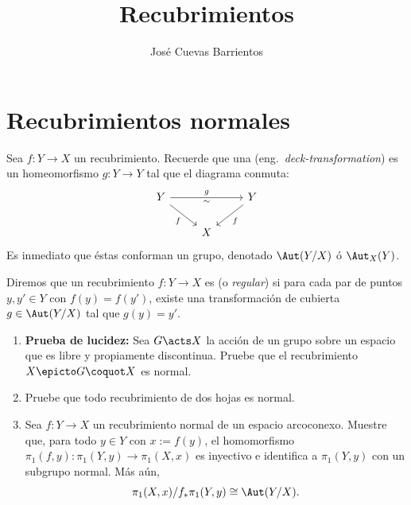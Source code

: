 \documentclass[11pt, reqno]{amsart}
\title{Recubrimientos}
\date{\DTMdate{2026-10-15}}
\author{José Cuevas Barrientos}
\DeclareMathOperator\pr{pr}
\begin{document}
\maketitle

\section{Recubrimientos normales}
Sea $f \colon Y \to X$ un recubrimiento.
Recuerde que una  (eng.\ \emph{deck-transformation}) es un homeomorfismo $g \colon Y \to Y$ tal que el
diagrama conmuta:
\[\begin{tikzcd}
	Y && Y \\
	& X
	\arrow["g", "\sim"', from=1-1, to=1-3]
	\arrow["f"', from=1-1, to=2-2]
	\arrow["f", from=1-3, to=2-2]
\end{tikzcd}\]
Es inmediato que éstas conforman un grupo, denotado $\Aut(Y/X)$ ó $\Aut_X(Y)$.
\begin{mydef}
	Diremos que un recubrimiento $f\colon Y \to X$ es  (o \emph{regular}) si para cada par de puntos $y, y' \in Y$ con
	$f(y) = f(y')$, existe una transformación de cubierta $g \in \Aut(Y/X)$ tal que $g(y) = y'$.
\end{mydef}
\begin{enumerate}
	\item \textbf{Prueba de lucidez:}
		Sea $G \acts X$ la acción de un grupo sobre un espacio que es libre y propiamente discontinua.
		Pruebe que el recubrimiento $X \epicto G\coquot X$ es normal.

	\item\label{ex:twofold_cov}
		Pruebe que todo recubrimiento de dos hojas es normal.

	\item\lookright Sea $f \colon Y \to X$ un recubrimiento normal de un espacio arcoconexo.
		Muestre que, para todo $y\in Y$ con $x := f(y)$, el homomorfismo $\pi_1(f, y) \colon \pi_1(Y, y) \to \pi_1(X, x)$ es
		inyectivo e identifica a $\pi_1(Y, y)$ con un subgrupo normal.
		Más aún,
		\[
			\pi_1(X, x) / f_*\pi_1(Y, y) \cong \Aut(Y/X).
		\]

\end{enumerate}
\end{document}
